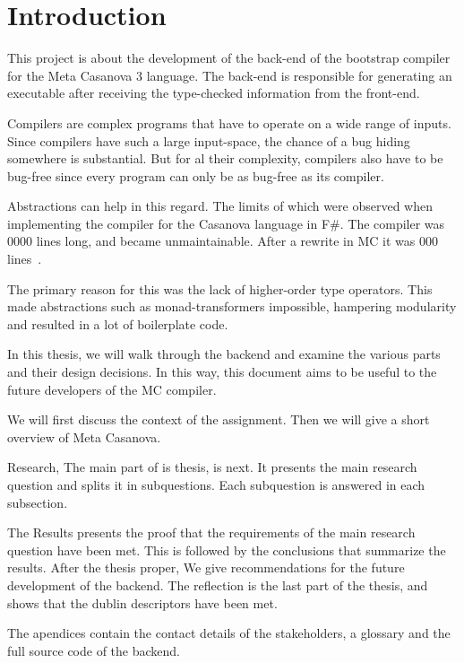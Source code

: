 \section{Introduction}
This project is about the development of the back-end of the bootstrap compiler for the Meta Casanova 3 language.
The back-end is responsible for generating an executable after receiving the type-checked information from the front-end.

Compilers are complex programs that have to operate on a wide range of inputs.
Since compilers have such a large input-space, the chance of a bug hiding somewhere is substantial. 
But for al their complexity, compilers also have to be bug-free since every program can only be as bug-free as its compiler.

Abstractions can help in this regard.
The limits of which were observed when implementing the compiler for the Casanova language in F\#.
The compiler was 0000 lines long, and became unmaintainable.
After a rewrite in MC it was 000 lines~\cite{maggiore}.

The primary reason for this was the lack of higher-order type operators.
This made abstractions such as monad-transformers impossible, hampering modularity and resulted in a lot of boilerplate code.

In this thesis, we will walk through the backend and examine the various parts and their design decisions.
In this way, this document aims to be useful to the future developers of the MC compiler.

We will first discuss the context of the assignment.
Then we will give a short overview of Meta Casanova.

Research, The main part of is thesis, is next.
It presents the main research question and splits it in subquestions.
Each subquestion is answered in each subsection.

The Results presents the proof that the requirements of the main research question have been met.
This is followed by the conclusions that summarize the results.
After the thesis proper, We give recommendations for the future development of the backend.
The reflection is the last part of the thesis, and shows that the dublin descriptors have been met.

The apendices contain the contact details of the stakeholders, a glossary and the full source code of the backend.




